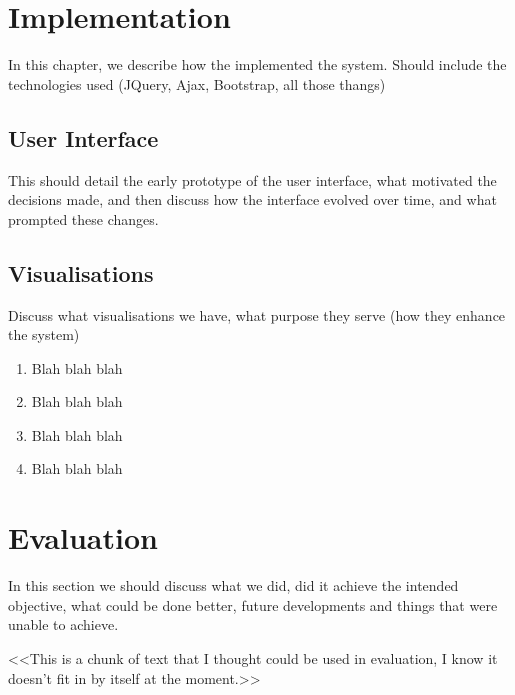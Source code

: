 \documentclass[a4paper]{l3proj}
\begin{document}
\chapter{Implementation}
\label{impl}

In this chapter, we describe how the implemented the system.  Should include the technologies used 
(JQuery, Ajax, Bootstrap, all those thangs)

\section{User Interface}

This should detail the early prototype of the user interface, what motivated the decisions made, 
and then discuss how the interface evolved over time, and what prompted these changes.



\section{Visualisations}

Discuss what visualisations we have, what purpose they serve (how they enhance the system)	
	
\begin{enumerate}
\item Blah blah blah
\item Blah blah blah
\item Blah blah blah
\item Blah blah blah
\end{enumerate}



\chapter{Evaluation}

In this section we should discuss what we did, did it achieve the intended objective, what could be done better, 
future developments and things that were unable to achieve.

<<This is a chunk of text that I thought could be used in evaluation, I know it doesn't fit in by itself at the moment.>>
\end{document}
